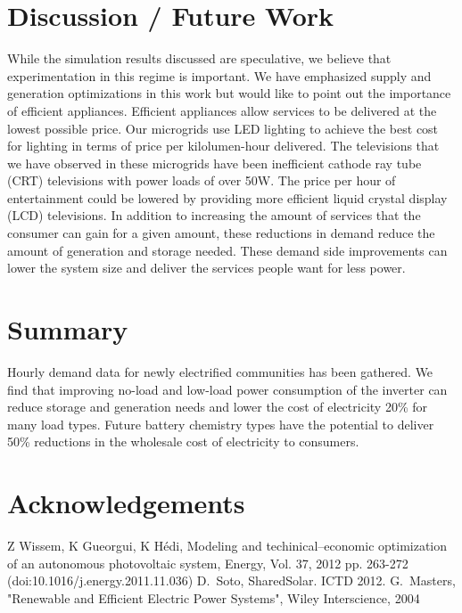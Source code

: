 \documentclass[conference]{IEEEtran}
\begin{document}
\section{Discussion / Future Work}
While the simulation results discussed are speculative, 
we believe that experimentation in this regime is important.
We have emphasized supply and generation optimizations in
this work but would like to point out the importance of 
efficient appliances.
Efficient appliances allow services to be delivered at the
lowest possible price.
Our microgrids use LED lighting to achieve the best cost for
lighting in terms of price per kilolumen-hour delivered.
The televisions that we have observed in these microgrids 
have been inefficient cathode ray tube (CRT) televisions
with power loads of over 50W.
The price per hour of entertainment could be lowered by providing
more efficient liquid crystal display (LCD) televisions.
In addition to increasing the amount of services that the consumer
can gain for a given amount, these reductions in demand
reduce the amount of generation and storage needed.
These demand side improvements can lower the system size and
deliver the services people want for less power.





\section{Summary}
Hourly demand data for newly electrified communities has been gathered.
We find that improving no-load and low-load power consumption of the
inverter can reduce storage and generation needs and lower the cost
of electricity 20\% for many load types.
Future battery chemistry types have the potential to deliver 50\% 
reductions in the wholesale cost of electricity to consumers.


\section{Acknowledgements}



\begin{thebibliography}{1}
Z Wissem, K Gueorgui, K H\'edi,
Modeling and techinical--economic optimization of an autonomous
photovoltaic system,
Energy, Vol. 37, 2012 pp. 263-272
(doi:10.1016/j.energy.2011.11.036)
D.~Soto, SharedSolar. ICTD 2012.
G.~Masters,
"Renewable and Efficient Electric Power Systems",
Wiley Interscience,
2004
\end{thebibliography}
\end{document}

